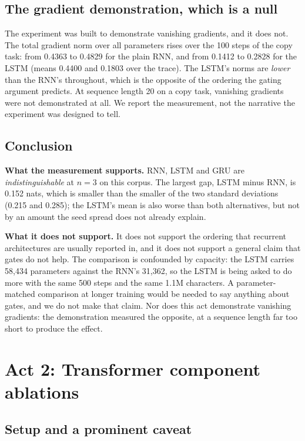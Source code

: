 \documentclass[11pt,a4paper]{article}
\begin{document}
\subsection{The gradient demonstration, which is a null}
\label{sec:act1-grad}

The experiment was built to demonstrate vanishing gradients, and it does not.
The total gradient norm over all parameters rises over the 100 steps of the copy
task: from 0.4363 to 0.4829 for the plain RNN, and from 0.1412 to 0.2828 for
the LSTM (means 0.4400 and 0.1803 over the trace). The LSTM's norms are
\emph{lower} than the RNN's throughout, which is the opposite of the ordering the
gating argument predicts. At sequence length 20 on a copy task, vanishing
gradients were not demonstrated at all. We report the measurement, not the
narrative the experiment was designed to tell.

\subsection{Conclusion}
\label{sec:act1-conclusion}

\textbf{What the measurement supports.} RNN, LSTM and GRU are
\emph{indistinguishable} at $n = 3$ on this corpus. The largest gap, LSTM minus
RNN, is 0.152 nats, which is smaller than the smaller of the two standard
deviations (0.215 and 0.285); the LSTM's mean is also worse than both
alternatives, but not by an amount the seed spread does not already explain.

\textbf{What it does not support.} It does not support the ordering that
recurrent architectures are usually reported in, and it does not support a
general claim that gates do not help. The comparison is confounded by capacity:
the LSTM carries 58,434 parameters against the RNN's 31,362, so the LSTM is
being asked to do more with the same 500 steps and the same 1.1M characters. A
parameter-matched comparison at longer training would be needed to say anything
about gates, and we do not make that claim. Nor does this act demonstrate
vanishing gradients: the demonstration measured the opposite, at a sequence
length far too short to produce the effect. %


\section{Act 2: Transformer component ablations}
\label{sec:act2}

\subsection{Setup and a prominent caveat}
\label{sec:act2-setup}
\end{document}
